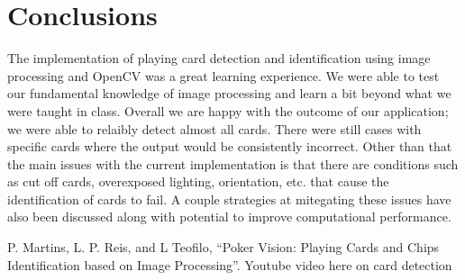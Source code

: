 \documentclass[conference]{IEEEtran}
\begin{document}
\section{Conclusions}
The implementation of playing card detection and identification using image processing and OpenCV
was a great learning experience. We were able to test our fundamental knowledge of image processing
and learn a bit beyond what we were taught in class. Overall we are happy with the outcome of our
application; we were able to relaibly detect almost all cards. There were still cases with specific
cards where the output would be consistently incorrect. Other than that the main issues with the
current implementation is that there are conditions such as cut off cards, overexposed lighting,
orientation, etc. that cause the identification of cards to fail. A couple strategies at mitegating
these issues have also been discussed along with potential to improve computational performance.

\begin{thebibliography}{00}
 P. Martins, L. P. Reis, and L Teofilo, ``Poker Vision: Playing Cards and
    Chips Identification based on Image Processing''.
 Youtube video here on card detection
\end{thebibliography}
\vspace{12pt}
\end{document}
